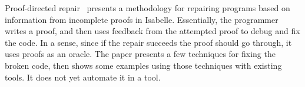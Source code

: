 
Proof-directed repair~\cite{dennis2006proof} presents a methodology
for repairing programs based on information from incomplete proofs in Isabelle.
Essentially, the programmer writes a proof, and then uses feedback
from the attempted proof to debug and fix the code.
In a sense, since if the repair succeeds the proof should go through,
it uses proofs as an oracle. The paper presents a few techniques for fixing the broken code,
then shows some examples using those techniques with existing tools.
It does not yet automate it in a tool.





